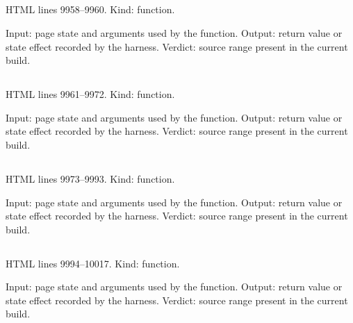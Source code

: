 \subsection*{\texttt{}}
\label{vf_547_risingCurveRows}
HTML lines 9958--9960. Kind: function.

Input: page state and arguments used by the function.
Output: return value or state effect recorded by the harness.
Verdict: source range present in the current build.

\subsection*{\texttt{}}
\label{vf_548_risingCurveDisplayRows}
HTML lines 9961--9972. Kind: function.

Input: page state and arguments used by the function.
Output: return value or state effect recorded by the harness.
Verdict: source range present in the current build.

\subsection*{\texttt{}}
\label{vf_549_drawRisingCurveBundle}
HTML lines 9973--9993. Kind: function.

Input: page state and arguments used by the function.
Output: return value or state effect recorded by the harness.
Verdict: source range present in the current build.

\subsection*{\texttt{}}
\label{vf_550_renderReviewRising}
HTML lines 9994--10017. Kind: function.

Input: page state and arguments used by the function.
Output: return value or state effect recorded by the harness.
Verdict: source range present in the current build.


